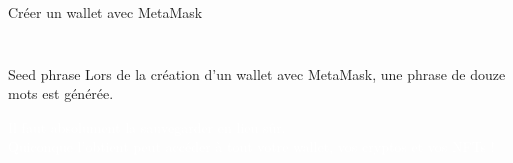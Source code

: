 \begin{frame}{Créer un wallet avec MetaMask}
\begin{columns}
\begin{column}{0.25\textwidth}
\begin{figure}
{        }
      \end{figure}
    \end{column}
    \begin{column}{0.05\textwidth}\end{column}
  \end{columns}
\end{frame}

\begin{frame}{Seed phrase}
  Lors de la création d'un wallet avec MetaMask, une phrase de douze mots est générée.

  \begin{center}
    \begin{tcolorbox}[arc=1ex, colback=myuniversity, colframe=myuniversity, left=3pt, right=3pt, top=3pt, bottom=2pt]
      \vspace*{1cm}
      \begin{center}
        \begin{huge}
          \textcolor{white}{
            Il faut absolument la sauvegarder en lieu sûr.\\
            Quiconque l'obtient peut accéder à tout votre wallet, vos cryptos et vos NFTs !
          }
        \end{huge}
      \end{center}
      \vspace*{1cm}
    \end{tcolorbox}
  \end{center}
\end{frame}